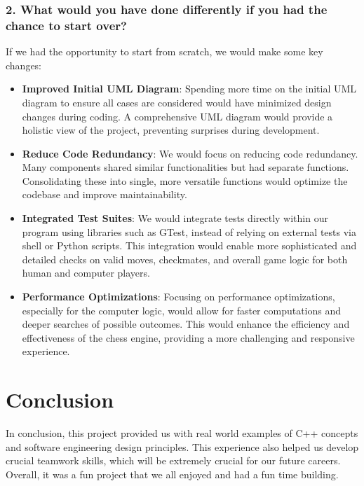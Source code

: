 \documentclass[12pt]{article}
\begin{document}
\subsubsection*{2. What would you have done differently if you had the chance to start over?}
If we had the opportunity to start from scratch, we would make some key changes:
\begin{itemize}
    \item \textbf{Improved Initial UML Diagram}: Spending more time on the initial UML diagram to ensure all cases are considered would have minimized design changes during coding. A comprehensive UML diagram would provide a holistic view of the project, preventing surprises during development.
    \item \textbf{Reduce Code Redundancy}: We would focus on reducing code redundancy. Many components shared similar functionalities but had separate functions. Consolidating these into single, more versatile functions would optimize the codebase and improve maintainability.
    \item \textbf{Integrated Test Suites}: We would integrate tests directly within our program using libraries such as GTest, instead of relying on external tests via shell or Python scripts. This integration would enable more sophisticated and detailed checks on valid moves, checkmates, and overall game logic for both human and computer players.
    \item \textbf{Performance Optimizations}: Focusing on performance optimizations, especially for the computer logic, would allow for faster computations and deeper searches of possible outcomes. This would enhance the efficiency and effectiveness of the chess engine, providing a more challenging and responsive experience.
\end{itemize}
\section*{Conclusion}
In conclusion, this project provided us with real world examples of C++ concepts and software engineering design principles. This experience also helped us develop crucial teamwork skills, which will be extremely crucial for our future careers. Overall, it was a fun project that we all enjoyed and had a fun time building.
\end{document}
